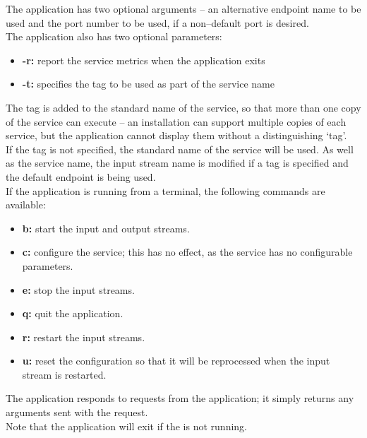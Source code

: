The application has two optional arguments -- an alternative endpoint name to be used and
the port number to be used, if a non--default port is desired.\\

The application also has two optional parameters:
\begin{itemize}
\item \textbf{-r:} report the service metrics when the application exits
\item \textbf{-t:} specifies the tag to be used as part of the service name
\end{itemize}
The tag is added to the standard name of the service, so that more than one copy of the
service can execute -- an \mplusm{} installation can support multiple copies of each
 service, but the 
application cannot display them without a distinguishing `tag'.\\
If the tag is not specified, the standard name of the service will be used.
As well as the service name, the input stream name is modified if a tag is specified and
the default endpoint is being used.\\

If the application is running from a terminal, the following commands are available:
\begin{itemize}
\item \textbf{b:} start the input and output streams. 
\item \textbf{c:} configure the service; this has no effect, as the service has no
configurable parameters. 
\item \textbf{e:} stop the input streams. 
\item \textbf{q:} quit the application. 
\item \textbf{r:} restart the input streams.
\item \textbf{u:} reset the configuration so that it will be reprocessed when the input
stream is restarted. 
\end{itemize}
The  application responds to
 requests from the
 application; it simply returns any arguments
sent with the request.\\

Note that the application will exit if the
 is not running.\\

